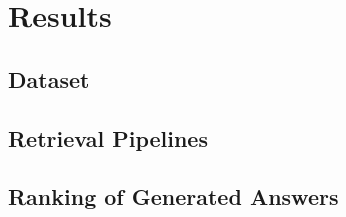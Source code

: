 \chapter{Results}
\section{Dataset}

\section{Retrieval Pipelines}

\section{Ranking of Generated Answers}